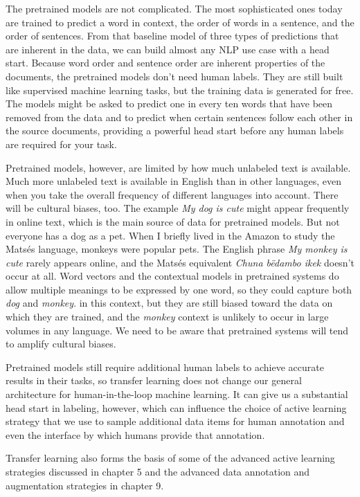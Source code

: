 \documentclass[sigconf,nonacm,screen,pbalance]{acmart}
\begin{document}
The
pretrained models are not complicated. The most sophisticated ones today are trained to
predict a word in context, the order of words in a sentence, and the order of sentences.
From that baseline model of three types of predictions that are inherent in the data, we
can build almost any NLP use case with a head start. Because word order and sentence
order are inherent properties of the documents, the pretrained models don't need human
labels. They are still built like supervised machine learning tasks, but the training
data is generated for free. The models might be asked to predict one in every ten words
that have been removed from the data and to predict when certain sentences follow each
other in the source documents, providing a powerful head start before any human labels
are required for your task.

Pretrained
models, however, are limited by how much unlabeled text is available. Much more
unlabeled text is available in English than in other languages, even when you take the
overall frequency of different languages into account. There will be cultural biases,
too. The example {\em My dog is cute} might appear frequently in online text, which is
the main source of data for pretrained models. But not everyone has a dog as a pet. When
I briefly lived in the Amazon to study the Matsés language, monkeys were popular pets.
The English phrase {\em My monkey is cute} rarely appears online, and the Matsés
equivalent {\em Chuna bëdambo ikek} doesn't occur at all. Word vectors and the
contextual models in pretrained systems do allow multiple meanings to be expressed by
one word, so they could capture both {\em dog} and {\em monkey}. in this context, but
they are still biased toward the data on which they are trained, and the {\em monkey}
context is unlikely to occur in large volumes in any language. We need to be aware that
pretrained systems will tend to amplify cultural biases.

Pretrained
models still require additional human labels to achieve accurate results in their tasks,
so transfer learning does not change our general architecture for human-in-the-loop
machine learning. It can give us a substantial head start in labeling, however, which
can influence the choice of active learning strategy that we use to sample additional
data items for human annotation and even the interface by which humans provide that
annotation.

Transfer
learning also forms the basis of some of the advanced active learning strategies
discussed in chapter 5 and the advanced data annotation and augmentation strategies in
chapter
9.
\end{document}
